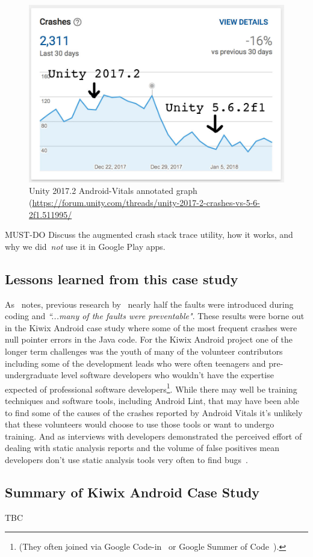 \begin{figure}[htbp!]
    \centering
    \includegraphics[width=12cm]{images/unity-forum/unity-2017-2-android-vitals.jpg}
    \caption{Unity 2017.2 Android-Vitals annotated graph (\url{https://forum.unity.com/threads/unity-2017-2-crashes-vs-5-6-2f1.511995/}}
    \label{fig:unity-2017-2-android-vitals-annotated-graph}
\end{figure}

MUST-DO Discuss the augmented crash stack trace utility, how it works, and why we did~\emph{not} use it in Google Play apps.


\subsection{Lessons learned from this case study}

As~\citep{kidwell2015_toward_fault_taxonomy_application_of_software_analytics} notes, previous research by~\citep{weider1998_software_fault_prevention_in_coding_and_RCA} nearly half the faults were introduced during coding and \emph{``...many of the faults were preventable"}. These results were borne out in the Kiwix Android case study where some of the most frequent crashes were null pointer errors in the Java code. For the Kiwix Android project one of the longer term challenges was the youth of many of the volunteer contributors including some of the development leads who were often teenagers and pre-undergraduate level software developers who wouldn't have the expertise expected of professional software developers\footnote{(They often joined via Google Code-in~\citep{google_code_in_archive} or Google Summer of Code~\citep{google_summer_of_code}).}. While there may well be training techniques and software tools, including Android Lint, that may have been able to find some of the causes of the crashes reported by Android Vitals it's unlikely that these volunteers would choose to use those tools or want to undergo training. And as interviews with developers demonstrated the perceived effort of dealing with static analysis reports and the volume of false positives mean developers don't use static analysis tools very often to find bugs~\citep{johnson2013_why_dont_devs_use_static_analysis}.

\subsection{Summary of Kiwix Android Case Study}
TBC